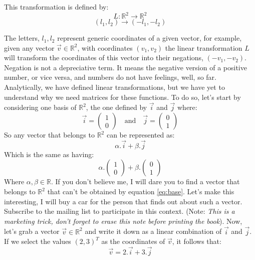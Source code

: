 \documentclass[600paper, 11pt,twoside,openany]{kdp}
\begin{document}
 This transformation is defined by:
\[L:\mathbb{R}^2 \rightarrow \mathbb{R}^2\]
\[(l_1,l_2) \rightarrow (-l_1, -l_2) \]
\par 
\vspace{-3pt}
\indent The letters, $l_1,l_2$ represent generic coordinates of a given vector, for example, given any vector  $\overrightarrow{v} \in \mathbb{R}^2$, with coordinates $(v_1,v_2)$ the linear transformation $L$ will transform the coordinates of this vector into their negations, $(-v_1,-v_2)$. Negation is not a depreciative term. It means the negative version of a positive number, or vice versa, and numbers do not have feelings, well, so far. Analytically, we have defined linear transformations, but we have yet to understand why we need matrices for these functions. To do so, let’s start by considering one basis of $\mathbb{R}^2$, the one defined by $\overrightarrow{i}$ and $\overrightarrow{j}$ where:
\[\overrightarrow{i} =\begin{pmatrix}
 1 \\
 0
 \end{pmatrix}\quad \textrm{and} \quad  \overrightarrow{j} =\begin{pmatrix}
 0 \\
 1
 \end{pmatrix}\]
\indent So any vector that belongs to $\mathbb{R}^2$ can be represented as:
\[\alpha.\overrightarrow{i} + \beta.\overrightarrow{j} \]
\indent Which is the same as having:
\begin{equation}\label{eq:base}
\alpha.\begin{pmatrix}
 1 \\
 0
 \end{pmatrix} + \beta.\begin{pmatrix}
 0 \\
 1
 \end{pmatrix}
\end{equation}
\indent Where $\alpha, \beta  \in \mathbb{R}$. If you don’t believe me, I will dare you to find a vector that belongs to $\mathbb{R}^2$ that can’t be obtained by equation \ref{eq:base}. Let's make this interesting, I will buy a car for the person that finds out about such a vector. Subscribe to the mailing list to participate in this context. (Note: \textit{This is a marketing trick, don't forget to erase this note before printing the book}). Now, let’s grab a vector  $\overrightarrow{v} \in \mathbb{R}^2$ and write it down as a linear combination of $\overrightarrow{i}$ and $\overrightarrow{j}$. If we select the values $(2,3)^T$ as the coordinates of $\overrightarrow{v}$, it follows that:
\begin{equation}\label{eq:base2}
\overrightarrow{v} = 2.\overrightarrow{i} + 3.\overrightarrow{j}
\end{equation}
\end{document}
